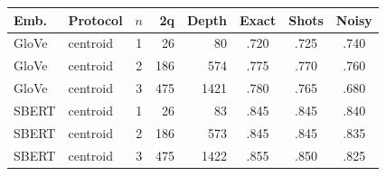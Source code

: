 \begin{tabular}{@{}llcrrccc@{}}
\toprule
Emb. & Protocol & $n$ & 2q & Depth & Exact & Shots & Noisy \\
\midrule
GloVe & centroid & 1 & 26 & 80 & .720 & .725 & .740 \\
GloVe & centroid & 2 & 186 & 574 & .775 & .770 & .760 \\
GloVe & centroid & 3 & 475 & 1421 & .780 & .765 & .680 \\
SBERT & centroid & 1 & 26 & 83 & .845 & .845 & .840 \\
SBERT & centroid & 2 & 186 & 573 & .845 & .845 & .835 \\
SBERT & centroid & 3 & 475 & 1422 & .855 & .850 & .825 \\
\bottomrule
\end{tabular}